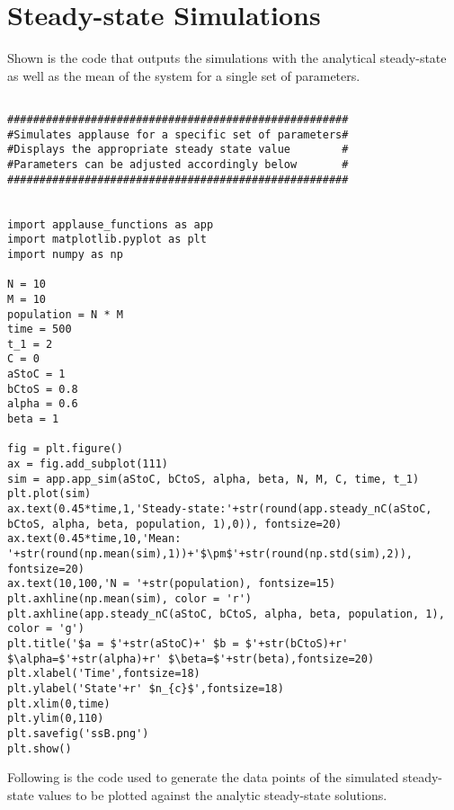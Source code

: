 \chapter{Steady-state Simulations}
\label{apndx:steadstatesim}
Shown is the code that outputs the simulations with the analytical steady-state as well as the mean of the system for a single set of parameters.

\begin{lstlisting}

#####################################################
#Simulates applause for a specific set of parameters#
#Displays the appropriate steady state value        #
#Parameters can be adjusted accordingly below       #
#####################################################


import applause_functions as app
import matplotlib.pyplot as plt
import numpy as np

N = 10
M = 10
population = N * M
time = 500
t_1 = 2
C = 0
aStoC = 1
bCtoS = 0.8
alpha = 0.6
beta = 1

fig = plt.figure()
ax = fig.add_subplot(111)
sim = app.app_sim(aStoC, bCtoS, alpha, beta, N, M, C, time, t_1)
plt.plot(sim)
ax.text(0.45*time,1,'Steady-state:'+str(round(app.steady_nC(aStoC, bCtoS, alpha, beta, population, 1),0)), fontsize=20)
ax.text(0.45*time,10,'Mean: '+str(round(np.mean(sim),1))+'$\pm$'+str(round(np.std(sim),2)), fontsize=20)
ax.text(10,100,'N = '+str(population), fontsize=15)
plt.axhline(np.mean(sim), color = 'r')
plt.axhline(app.steady_nC(aStoC, bCtoS, alpha, beta, population, 1), color = 'g')
plt.title('$a = $'+str(aStoC)+' $b = $'+str(bCtoS)+r' $\alpha=$'+str(alpha)+r' $\beta=$'+str(beta),fontsize=20)
plt.xlabel('Time',fontsize=18)
plt.ylabel('State'+r' $n_{c}$',fontsize=18)
plt.xlim(0,time)
plt.ylim(0,110)
plt.savefig('ssB.png')
plt.show()

\end{lstlisting}

Following is the code used to generate the data points of the simulated steady-state values to be plotted against the analytic steady-state solutions.

